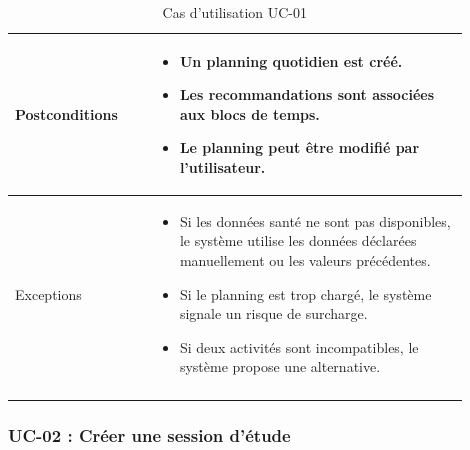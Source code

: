 \documentclass[12pt]{article}
\begin{document}
\begin{longtable}{|p{0.28\linewidth}|p{0.62\linewidth}|}
Postconditions &
\begin{itemize}[leftmargin=*]
    \item Un planning quotidien est créé.
    \item Les recommandations sont associées aux blocs de temps.
    \item Le planning peut être modifié par l'utilisateur.
\end{itemize}
\\ \hline

Exceptions &
\begin{itemize}[leftmargin=*]
    \item Si les données santé ne sont pas disponibles, le système utilise les données déclarées manuellement ou les valeurs précédentes.
    \item Si le planning est trop chargé, le système signale un risque de surcharge.
    \item Si deux activités sont incompatibles, le système propose une alternative.
\end{itemize}
\\ \hline
\caption{Cas d'utilisation UC-01}
\label{tab:uc-01} 
\end{longtable}

\subsubsection{UC-02 : Créer une session d'étude}
\end{document}
